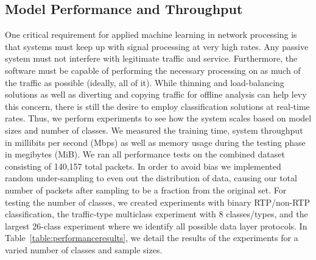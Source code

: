 \subsection{Model Performance and Throughput}
One critical requirement for applied machine learning in network processing is that systems must keep up with signal processing at very high rates. Any passive system must not interfere with legitimate traffic and service. Furthermore, the software must be capable of performing the necessary processing on as much of the traffic as possible (ideally, all of it). While thinning and load-balancing solutions as well as diverting and copying traffic for offline analysis can help levy this concern, there is still the desire to employ classification solutions at real-time rates. Thus, we perform experiments to see how the system scales based on model sizes and number of classes. We measured the training time, system throughput in millibits per second (Mbps) as well as memory usage during the testing phase in megibytes (MiB). We ran all performance tests on the combined dataset consisting of 140,157 total packets. In order to avoid bias we implemented random under-sampling to even out the distribution of data, causing our total number of packets after sampling to be a fraction from the original set. For testing the number of classes, we created experiments with binary RTP/non-RTP classification, the traffic-type multiclass experiment with 8 classes/types, and the largest 26-class experiment where we identify all possible data layer protocols. In Table~\ref{table:performanceresults}, we detail the results of the experiments for a varied number of classes and sample sizes.

